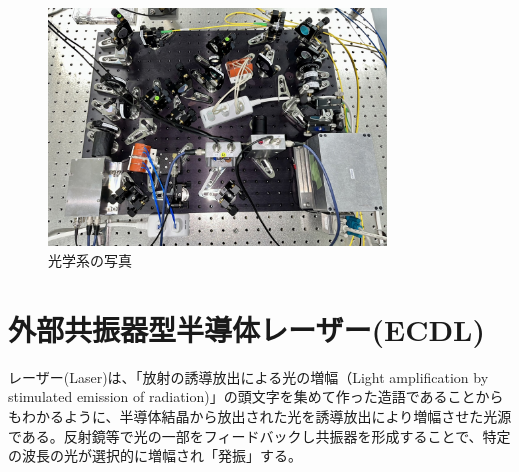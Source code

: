 \documentclass[dvipdfmx]{jsreport}
\begin{document}
\begin{figure}[hbtp]
\centering
\includegraphics[width=0.8\textwidth]{images/all_real.jpg}
\caption{\label{fig:all_real}光学系の写真}
\end{figure}

\clearpage
\section{外部共振器型半導体レーザー(ECDL)}
レーザー(Laser)は、「放射の誘導放出による光の増幅（Light amplification by stimulated emission of radiation)」の頭文字を集めて作った造語であることからもわかるように、半導体結晶から放出された光を誘導放出により増幅させた光源である。反射鏡等で光の一部をフィードバックし共振器を形成することで、特定の波長の光が選択的に増幅され「発振」する。\cite{yamamotomasashi}
\end{document}

